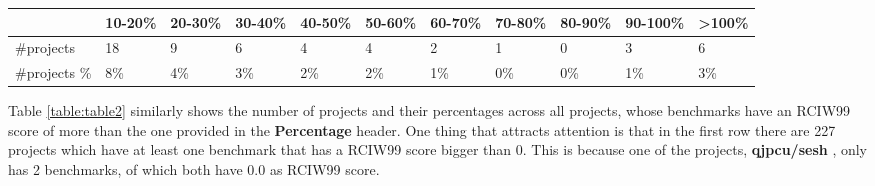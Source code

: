 \documentclass{seal_thesis}
\begin{document}
\begin{table}[H]
{\begin{tabular}{lllllllllll}
		\rowcolor[HTML]{FFFC9E} 
		\multicolumn{1}{|l|}{\cellcolor[HTML]{FFFC9E}Percentages} & \multicolumn{1}{l|}{\cellcolor[HTML]{FFFC9E}10-20\%} & \multicolumn{1}{l|}{\cellcolor[HTML]{FFFC9E}20-30\%} & \multicolumn{1}{l|}{\cellcolor[HTML]{FFFC9E}30-40\%} & \multicolumn{1}{l|}{\cellcolor[HTML]{FFFC9E}40-50\%} & \multicolumn{1}{l|}{\cellcolor[HTML]{FFFC9E}50-60\%} & \multicolumn{1}{l|}{\cellcolor[HTML]{FFFC9E}60-70\%} & \multicolumn{1}{l|}{\cellcolor[HTML]{FFFC9E}70-80\%} & \multicolumn{1}{l|}{\cellcolor[HTML]{FFFC9E}80-90\%} & \multicolumn{1}{l|}{\cellcolor[HTML]{FFFC9E}90-100\%} & \multicolumn{1}{l|}{\cellcolor[HTML]{FFFC9E}\textgreater{}100\%} \\ \hline
		\multicolumn{1}{|l|}{\#projects}                          & \multicolumn{1}{l|}{18}                              & \multicolumn{1}{l|}{9}                               & \multicolumn{1}{l|}{6}                               & \multicolumn{1}{l|}{4}                               & \multicolumn{1}{l|}{4}                               & \multicolumn{1}{l|}{2}                               & \multicolumn{1}{l|}{1}                               & \multicolumn{1}{l|}{0}                               & \multicolumn{1}{l|}{3}                                & \multicolumn{1}{l|}{6}                                           \\ \hline
		\multicolumn{1}{|l|}{\#projects \%}                       & \multicolumn{1}{l|}{8\%}                             & \multicolumn{1}{l|}{4\%}                             & \multicolumn{1}{l|}{3\%}                             & \multicolumn{1}{l|}{2\%}                             & \multicolumn{1}{l|}{2\%}                             & \multicolumn{1}{l|}{1\%}                             & \multicolumn{1}{l|}{0\%}                             & \multicolumn{1}{l|}{0\%}                             & \multicolumn{1}{l|}{1\%}                              & \multicolumn{1}{l|}{3\%}                                         \\ \hline
	\end{tabular}
	}
\end{table}

\noindent Table \ref{table:table2} similarly shows the number of projects and their percentages across all projects, whose benchmarks have an RCIW99 score of more than the one provided in the \textbf{Percentage} header. One thing that attracts attention is that in the first row there are 227 projects which have at least one benchmark that has a RCIW99 score bigger than 0. This is because one of the projects, \textbf{qjpcu/sesh} \cite{qjpcu/sesh}, only has 2 benchmarks, of which both have 0.0 as RCIW99 score.
\end{document}
